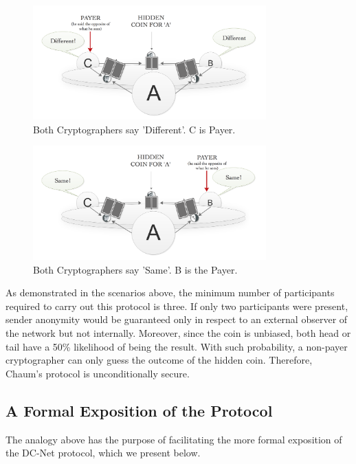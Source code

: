 \begin{enumerate}
\begin{enumerate}
        \begin{figure}[h!]
            \centering
            \includegraphics[width=0.80\textwidth]{Images/AdifferentCaseDifferent.png}
            \caption{Both Cryptographers say 'Different'. C is Payer.}
            \label{fig:AdifferentCaseDifferent}
        \end{figure}
        \begin{figure}[h!]
            \centering
            \includegraphics[width=0.80\textwidth]{Images/AdifferentCaseSame.png}
            \caption{Both Cryptographers say 'Same'. B is the Payer.}
            \label{fig:AdifferentCaseSame}
        \end{figure}
    \end{enumerate}
\end{enumerate}


As demonstrated in the scenarios above, the minimum number of participants required to carry out this protocol is three. If only two participants were present, sender anonymity would be guaranteed only in respect to an external observer of the network but not internally. Moreover, since the coin is unbiased, both head or tail have a 50{\%} likelihood of being the result. With such probability, a non-payer cryptographer can only guess the outcome of the hidden coin. Therefore, Chaum's protocol is unconditionally secure. \label{sec:internalExternalAnon}



\subsection{A Formal Exposition of the Protocol}
The analogy above has the purpose of facilitating the more formal exposition of the DC-Net protocol, which we present below. 

